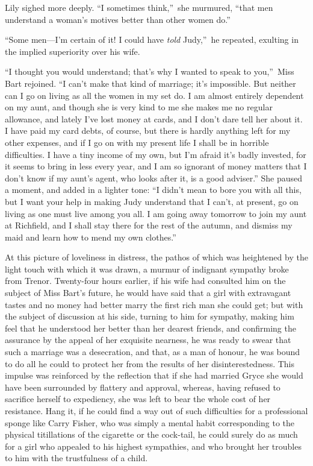 \documentclass[12pt,a4paper]{book}
\begin{document}
Lily sighed more deeply. ``I sometimes think,''\ she murmured, ``that
men understand a woman's motives better than other women do.''





``Some men---I'm certain of it! I could have \textit{told} Judy,''\ he
repeated, exulting in the implied superiority over his wife.





``I thought you would understand; that's why I wanted to speak to
you,''\ Miss Bart rejoined. ``I can't make that kind of marriage;
it's impossible. But neither can I go on living as all the women
in my set do. I am almost entirely dependent on my aunt, and
though she is very kind to me she makes me no regular allowance,
and lately I've lost money at cards, and I don't dare tell her
about it. I have paid my card debts, of course, but there is
hardly anything left for my other expenses, and if I go on with
my present life I shall be in horrible difficulties. I have a
tiny income of my own, but I'm afraid it's badly invested, for it
seems to bring in less every year, and I am so ignorant of money
matters that I don't know if my aunt's agent, who looks after it,
is a good adviser.'' She paused a moment, and added in a lighter
tone: ``I didn't mean to bore you with all this, but I want your
help in making Judy understand that I can't, at present, go on
living as one must live among you all. I am going away tomorrow
to join my aunt at Richfield, and I shall stay there for the rest
of the autumn, and dismiss my maid and learn how to mend my own
clothes.''





At this picture of loveliness in distress, the pathos of which
was heightened by the light touch with which it was drawn, a
murmur of indignant sympathy broke from Trenor. Twenty-four hours
earlier, if his wife had consulted him on the subject of Miss
Bart's future, he would have said that a girl with extravagant
tastes and no money had better marry the first rich man she could
get; but with the subject of discussion at his side,
turning to him for sympathy, making him feel that he understood
her better than her dearest friends, and confirming the assurance
by the appeal of her exquisite nearness, he was ready to swear
that such a marriage was a desecration, and that, as a man of
honour, he was bound to do all he could to protect her from the
results of her disinterestedness. This impulse was reinforced by
the reflection that if she had married Gryce she would have been
surrounded by flattery and approval, whereas, having refused to
sacrifice herself to expediency, she was left to bear the whole
cost of her resistance. Hang it, if he could find a way out of
such difficulties for a professional sponge like Carry Fisher,
who was simply a mental habit corresponding to the physical
titillations of the cigarette or the cock-tail, he could surely
do as much for a girl who appealed to his highest sympathies, and
who brought her troubles to him with the trustfulness of a child.
\end{document}
